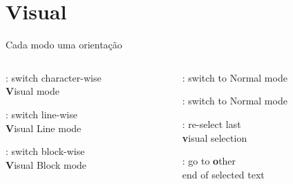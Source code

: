 \section{Visual}

\begin{frame}{Cada modo uma orientação}
    \begin{columns}
        \begin{column}{0.55\textwidth}
            \begin{widedescription}
                \item {}: switch character-wise \\ \textbf{V}isual mode
                \item {}: switch line-wise \\ \textbf{V}isual Line mode
                \item {}: switch block-wise \\ \textbf{V}isual Block mode
            \end{widedescription}
        \end{column}
        
        \begin{column}{0.45\textwidth}
            \begin{widedescription}
                \item {}: switch to Normal mode
                \item \key{\sk{C-[}}: switch to Normal mode
                \item {}: re-select last \\ \textbf{v}isual selection
                \item {}: go to \textbf{o}ther \\ end of selected text
            \end{widedescription}
        \end{column}
    \end{columns}
\end{frame}

